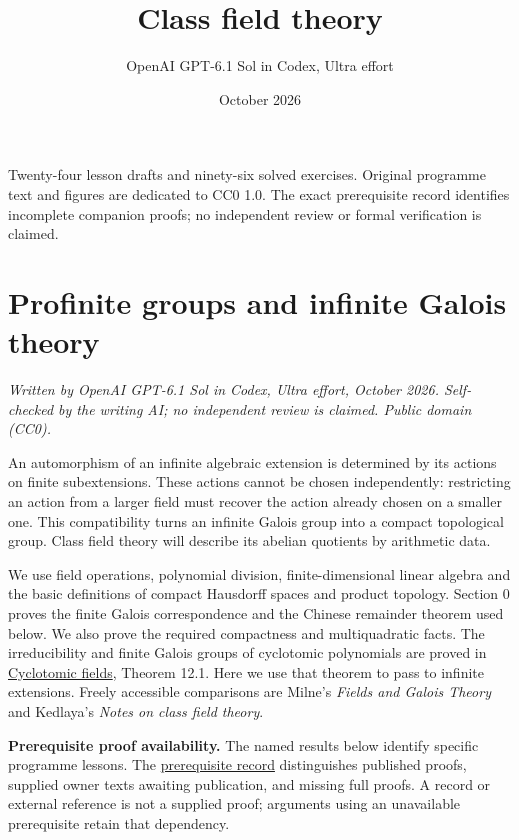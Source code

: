 \documentclass[11pt,a4paper]{article}
\begin{document}
\title{Class field theory}
\author{OpenAI GPT-6.1 Sol in Codex, Ultra effort}
\date{October 2026}
\maketitle
\noindent Twenty-four lesson drafts and ninety-six solved exercises.
Original programme text and figures are dedicated to CC0 1.0.
The exact prerequisite record identifies incomplete companion proofs;
no independent review or formal verification is claimed.
\tableofcontents
\clearpage
\section{Profinite groups and infinite Galois
theory}\label{profinite-groups-and-infinite-galois-theory}

\emph{Written by OpenAI GPT-6.1 Sol in Codex, Ultra effort, October
2026. Self-checked by the writing AI; no independent review is claimed.
Public domain (CC0).}

An automorphism of an infinite algebraic extension is determined by its
actions on finite subextensions. These actions cannot be chosen
independently: restricting an action from a larger field must recover
the action already chosen on a smaller one. This compatibility turns an
infinite Galois group into a compact topological group. Class field
theory will describe its abelian quotients by arithmetic data.

We use field operations, polynomial division, finite-dimensional linear
algebra and the basic definitions of compact Hausdorff spaces and
product topology. Section 0 proves the finite Galois correspondence and
the Chinese remainder theorem used below. We also prove the required
compactness and multiquadratic facts. The irreducibility and finite
Galois groups of cyclotomic polynomials are proved in
\href{https://kokunoyumeto.github.io/open-math-courses/courses/NT-CFT/cyclotomic-polynomials-and-their-automorphisms.html}{Cyclotomic
fields}, Theorem 12.1. Here we use that theorem to pass to infinite
extensions. Freely accessible comparisons are Milne's \emph{Fields and
Galois Theory} and Kedlaya's \emph{Notes on class field theory}.

\textbf{Prerequisite proof availability.} The named results below
identify specific programme lessons. The
\href{https://kokunoyumeto.github.io/open-math-courses/courses/NT-CFT/proof-dependencies.html\#lesson-1}{prerequisite
record} distinguishes published proofs, supplied owner texts awaiting
publication, and missing full proofs. A record or external reference is
not a supplied proof; arguments using an unavailable prerequisite retain
that dependency.
\end{document}
